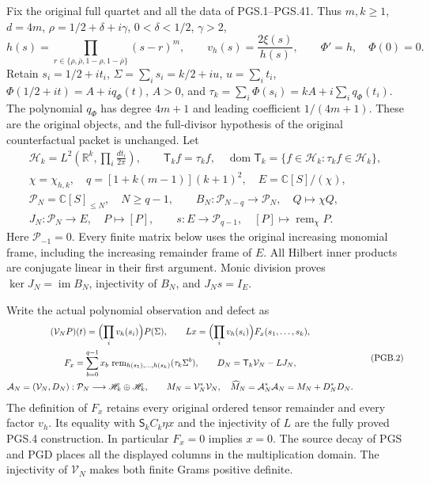 \documentclass[11pt,a4paper]{article}
\theoremstyle{definition}
\begin{document}
Fix the original full quartet and all the data of PGS.1--PGS.41.
Thus $m,k\geq1$, $d=4m$, $\rho=1/2+\delta+i\gamma$,
$0<\delta<1/2$, $\gamma>2$,
\[
 h(s)=\prod_{r\in\{\rho,\bar\rho,1-\rho,1-\bar\rho\}}(s-r)^m,
 \qquad v_h(s)=\frac{2\xi(s)}{h(s)},\qquad
 \Phi'=h,\quad\Phi(0)=0.
\]
Retain $s_i=1/2+it_i$, $\Sigma=\sum_i s_i=k/2+iu$,
$u=\sum_i t_i$, $\Phi(1/2+it)=A+iq_\Phi(t)$, $A>0$,
and $\tau_k=\sum_i\Phi(s_i)=kA+i\sum_iq_\Phi(t_i)$.
The polynomial $q_\Phi$ has degree $4m+1$ and leading
coefficient $1/(4m+1)$. These are the original objects, and the
full-divisor hypothesis of the original counterfactual packet is
unchanged. Let
\[
 \begin{gathered}
 \mathscr H_k=L^2\left(\mathbb R^k,\prod_i\frac{dt_i}{2\pi}\right),
 \qquad \mathsf T_k f=\tau_k f,
 \quad\operatorname{dom}\mathsf T_k
 =\{f\in\mathscr H_k:\tau_kf\in\mathscr H_k\},\\
 \chi=\chi_{h,k},\quad q=[1+k(m-1)](k+1)^2,
 \quad E=\mathbb C[S]/(\chi),\\
 \mathcal P_N=\mathbb C[S]_{\leq N},\quad N\geq q-1,
 \qquad B_N:\mathcal P_{N-q}\longrightarrow\mathcal P_N,
 \quad Q\longmapsto\chi Q,\\
 J_N:\mathcal P_N\longrightarrow E,\quad P\longmapsto[P],
 \qquad s:E\longrightarrow\mathcal P_{q-1},
 \quad [P]\longmapsto\operatorname{rem}_{\chi}P.
 \end{gathered}
 \tag{PGB.1}\label{eq:pgb-data}
\]
Here $\mathcal P_{-1}=0$. Every finite matrix below uses the
original increasing monomial frame, including the increasing
remainder frame of $E$. All Hilbert inner products are conjugate
linear in their first argument. Monic division proves
$\ker J_N=\operatorname{im}B_N$, injectivity of $B_N$, and
$J_Ns=I_E$.

Write the actual polynomial observation and defect as
\[
 \begin{gathered}
 (\mathcal V_NP)(t)=\Bigl(\prod_i v_h(s_i)\Bigr)P(\Sigma),
 \qquad Lx=\Bigl(\prod_i v_h(s_i)\Bigr)F_x(s_1,\ldots,s_k),\\
 F_x=\sum_{b=0}^{q-1}x_b\,
 \operatorname{rem}_{h(s_1),\ldots,h(s_k)}(\tau_k\Sigma^b),
 \qquad D_N=\mathsf T_k\mathcal V_N-LJ_N,\\
 \mathcal A_N=(\mathcal V_N,D_N):
 \mathcal P_N\longrightarrow\mathscr H_k\oplus\mathscr H_k,
 \qquad M_N=\mathcal V_N^*\mathcal V_N,
 \quad\widehat M_N=\mathcal A_N^*\mathcal A_N=M_N+D_N^*D_N.
 \end{gathered}
 \tag{PGB.2}\label{eq:pgb-original-maps}
\]
The definition of $F_x$ retains every original ordered tensor
remainder and every factor $v_h$. Its equality with
$\mathsf S_kC_k\eta x$ and the injectivity of $L$ are the
fully proved PGS.4 construction. In particular $F_x=0$ implies
$x=0$. The source decay of PGS and PGD places all the displayed
columns in the multiplication domain. The injectivity of
$\mathcal V_N$ makes both finite Grams positive definite.
\end{document}
